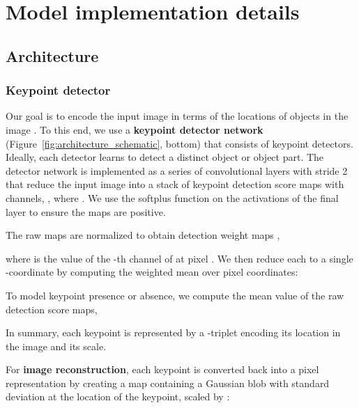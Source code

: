 
\renewcommand{\thesection}{S\arabic{section}}
\renewcommand{\thefigure}{S\arabic{figure}}
\renewcommand{\thetable}{S\arabic{table}}
\renewcommand{\theequation}{S\arabic{equation}}
\setcounter{equation}{0}
\setcounter{figure}{0}

\maketitle

\section{Model implementation details}\label{sup_sec:implementation_details}
\subsection{Architecture}

\subsubsection{Keypoint detector}

Our goal is to encode the input image in terms of the locations of objects in the image \cite{jakab_conditional_2018, zhang_unsupervised_2018}. To this end, we use a \textbf{keypoint detector network} (Figure~\ref{fig:architecture_schematic}, bottom) that consists of  keypoint detectors. Ideally, each detector learns to detect a distinct object or object part. The detector network is implemented as a series of convolutional layers with stride 2 that reduce the input image  into a stack of keypoint detection score maps with  channels, , where . We use the softplus function  on the activations of the final layer to ensure the maps are positive.

The raw maps  are normalized to obtain detection weight maps ,

where  is the value of the -th channel of  at pixel . We then reduce each  to a single -coordinate by computing the weighted mean over pixel coordinates:

To model keypoint presence or absence, we compute the mean value of the raw detection score maps,

In summary, each keypoint is represented by a -triplet encoding its location in the image and its scale.

For \textbf{image reconstruction}, each keypoint is converted back into a pixel representation by creating a map  containing a Gaussian blob with standard deviation  at the location of the keypoint, scaled by :

